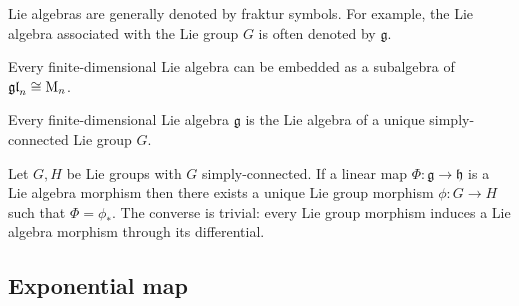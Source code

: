     \begin{notation}
        Lie algebras are generally denoted by fraktur symbols. For example, the Lie algebra associated with the Lie group $G$ is often denoted by $\mathfrak{g}$.
    \end{notation}

    \begin{theorem}[Ado]\label{lie:theorem:ado}
        Every finite-dimensional Lie algebra can be embedded as a subalgebra of $\mathfrak{gl}_n \cong \textup{M}_n$.
    \end{theorem}
    \begin{theorem}
        Every finite-dimensional Lie algebra $\mathfrak{g}$ is the Lie algebra of a unique simply-connected Lie group $G$.
    \end{theorem}

    \begin{property}\label{lie:prop_hom}
        Let $G, H$ be Lie groups with $G$ simply-connected. If a linear map $\Phi:\mathfrak{g}\rightarrow\mathfrak{h}$ is a Lie algebra morphism then there exists a unique Lie group morphism $\phi:G\rightarrow H$ such that $\Phi = \phi_*$. The converse is trivial: every Lie group morphism induces a Lie algebra morphism through its differential.
    \end{property}

\subsection{Exponential map}


